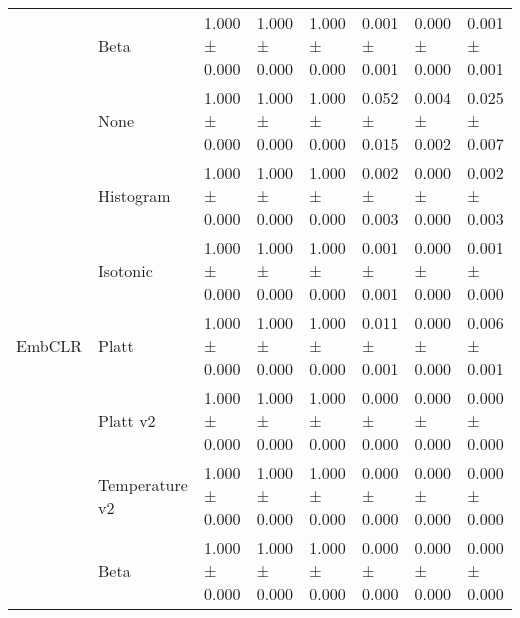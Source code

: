 \begin{tabular}{llllllll}
 & Beta & 1.000 ± 0.000 & 1.000 ± 0.000 & 1.000 ± 0.000 & 0.001 ± 0.001 & 0.000 ± 0.000 & 0.001 ± 0.001 \\
\cline{1-8}
\multirow[t]{7}{*}{EmbCLR} & None & 1.000 ± 0.000 & 1.000 ± 0.000 & 1.000 ± 0.000 & 0.052 ± 0.015 & 0.004 ± 0.002 & 0.025 ± 0.007 \\
 & Histogram & 1.000 ± 0.000 & 1.000 ± 0.000 & 1.000 ± 0.000 & 0.002 ± 0.003 & 0.000 ± 0.000 & 0.002 ± 0.003 \\
 & Isotonic & 1.000 ± 0.000 & 1.000 ± 0.000 & 1.000 ± 0.000 & 0.001 ± 0.001 & 0.000 ± 0.000 & 0.001 ± 0.000 \\
 & Platt & 1.000 ± 0.000 & 1.000 ± 0.000 & 1.000 ± 0.000 & 0.011 ± 0.001 & 0.000 ± 0.000 & 0.006 ± 0.001 \\
 & Platt v2 & 1.000 ± 0.000 & 1.000 ± 0.000 & 1.000 ± 0.000 & 0.000 ± 0.000 & 0.000 ± 0.000 & 0.000 ± 0.000 \\
 & Temperature v2 & 1.000 ± 0.000 & 1.000 ± 0.000 & 1.000 ± 0.000 & 0.000 ± 0.000 & 0.000 ± 0.000 & 0.000 ± 0.000 \\
 & Beta & 1.000 ± 0.000 & 1.000 ± 0.000 & 1.000 ± 0.000 & 0.000 ± 0.000 & 0.000 ± 0.000 & 0.000 ± 0.000 \\
\cline{1-8}
\bottomrule
\end{tabular}
